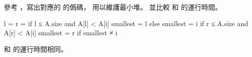 \startEXERCISE
參考 ，寫出對應的  的僞碼，
用以維護最小堆。
並比較  和  的運行時間。
\stopEXERCISE

\startANSWER
{}
\startCLRSCODE
l = 
r = 
if l ≤ A.size and A[l] < A[i]
	smallest = l
else
	smallest = i
if r ≤ A.size and A[r] < A[i]
	smallest = r
if smallest ≠ i
\stopCLRSCODE

 和  的運行時間相同。
\stopANSWER
